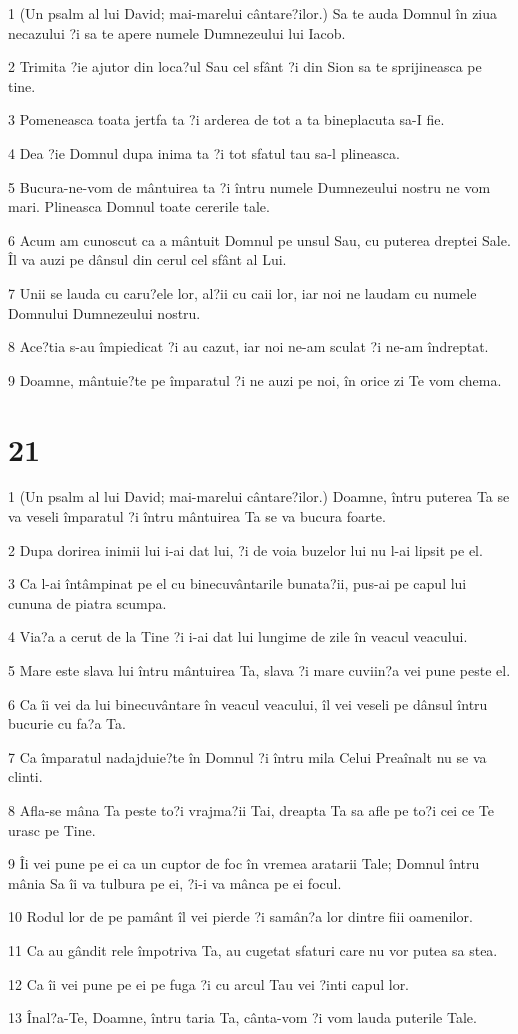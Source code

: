 \par 1 (Un psalm al lui David; mai-marelui cântare?ilor.) Sa te auda Domnul în ziua necazului ?i sa te apere numele Dumnezeului lui Iacob.
\par 2 Trimita ?ie ajutor din loca?ul Sau cel sfânt ?i din Sion sa te sprijineasca pe tine.
\par 3 Pomeneasca toata jertfa ta ?i arderea de tot a ta bineplacuta sa-I fie.
\par 4 Dea ?ie Domnul dupa inima ta ?i tot sfatul tau sa-l plineasca.
\par 5 Bucura-ne-vom de mântuirea ta ?i întru numele Dumnezeului nostru ne vom mari. Plineasca Domnul toate cererile tale.
\par 6 Acum am cunoscut ca a mântuit Domnul pe unsul Sau, cu puterea dreptei Sale. Îl va auzi pe dânsul din cerul cel sfânt al Lui.
\par 7 Unii se lauda cu caru?ele lor, al?ii cu caii lor, iar noi ne laudam cu numele Domnului Dumnezeului nostru.
\par 8 Ace?tia s-au împiedicat ?i au cazut, iar noi ne-am sculat ?i ne-am îndreptat.
\par 9 Doamne, mântuie?te pe împaratul ?i ne auzi pe noi, în orice zi Te vom chema.

\chapter{21}

\par 1 (Un psalm al lui David; mai-marelui cântare?ilor.) Doamne, întru puterea Ta se va veseli împaratul ?i întru mântuirea Ta se va bucura foarte.
\par 2 Dupa dorirea inimii lui i-ai dat lui, ?i de voia buzelor lui nu l-ai lipsit pe el.
\par 3 Ca l-ai întâmpinat pe el cu binecuvântarile bunata?ii, pus-ai pe capul lui cununa de piatra scumpa.
\par 4 Via?a a cerut de la Tine ?i i-ai dat lui lungime de zile în veacul veacului.
\par 5 Mare este slava lui întru mântuirea Ta, slava ?i mare cuviin?a vei pune peste el.
\par 6 Ca îi vei da lui binecuvântare în veacul veacului, îl vei veseli pe dânsul întru bucurie cu fa?a Ta.
\par 7 Ca împaratul nadajduie?te în Domnul ?i întru mila Celui Preaînalt nu se va clinti.
\par 8 Afla-se mâna Ta peste to?i vrajma?ii Tai, dreapta Ta sa afle pe to?i cei ce Te urasc pe Tine.
\par 9 Îi vei pune pe ei ca un cuptor de foc în vremea aratarii Tale; Domnul întru mânia Sa îi va tulbura pe ei, ?i-i va mânca pe ei focul.
\par 10 Rodul lor de pe pamânt îl vei pierde ?i samân?a lor dintre fiii oamenilor.
\par 11 Ca au gândit rele împotriva Ta, au cugetat sfaturi care nu vor putea sa stea.
\par 12 Ca îi vei pune pe ei pe fuga ?i cu arcul Tau vei ?inti capul lor.
\par 13 Înal?a-Te, Doamne, întru taria Ta, cânta-vom ?i vom lauda puterile Tale.

